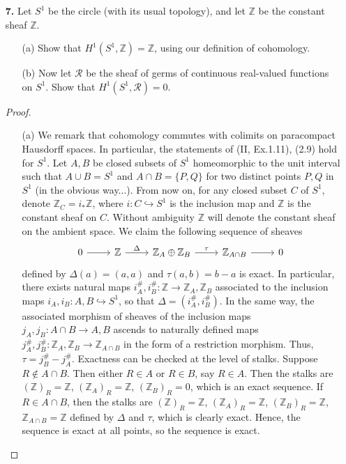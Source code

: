 \documentclass{article}
\newcommand{\fR}{\mathscr{R}}
\newcommand{\Z}{\mathbb{Z}}
\begin{document}
\begin{enumerate} [label=\textbf{\arabic*.}, leftmargin=0em]
\item[\textbf{7.}] Let $S^1$ be the circle (with its usual topology), and let $\Z$ be the constant sheaf $\Z$.
\begin{itemize}
    \item[(a)] Show that $H^1(S^1, \Z) = \Z$, using our definition of cohomology.
    \item[(b)] Now let $\fR$ be the sheaf of germs of continuous real-valued functions on $S^1$. Show that $H^1(S^1, \fR) = 0$.
\end{itemize}

\begin{proof} $ $ \vspace{0pt}
\begin{itemize} [leftmargin=0cm]
\item[(a)] We remark that cohomology commutes with colimits on paracompact Hausdorff spaces. In particular, the statements of (II, Ex.1.11), (2.9) hold for $S^1$. Let $A, B$ be closed subsets of $S^1$ homeomorphic to the unit interval such that $A \cup B = S^1$ and $A \cap B = \{ P, Q \}$ for two distinct points $P, Q$ in $S^1$ (in the obvious way...). From now on, for any closed subset $C$ of $S^1$, denote $\Z_C = i_* \Z$, where $i : C \hookrightarrow S^1$ is the inclusion map and $\Z$ is the constant sheaf on $C$. Without ambiguity $\Z$ will denote the constant sheaf on the ambient space. We claim the following sequence of sheaves
\[\begin{tikzcd}
    0 \arrow[r] & \Z \arrow[r, "\Delta"] & \Z_A \oplus \Z_B \arrow[r, "\tau"] & \Z_{A \cap B} \arrow[r] & 0
    \end{tikzcd}\]
defined by $\Delta(a) = (a, a)$ and $\tau(a, b) = b - a$ is exact. In particular, there exists natural maps $i^\#_A, i^\#_B : \Z \to \Z_A, \Z_B$ associated to the inclusion maps $i_A, i_B : A, B \hookrightarrow S^1$, so that $\Delta = (i_A^\#, i_B^\#)$. In the same way, the associated morphism of sheaves of the inclusion maps $j_A, j_B : A \cap B \to A, B$ ascends to naturally defined maps $j_A^\#, j_B^\# : \Z_A, \Z_B \to \Z_{A \cap B}$ in the form of a restriction morphism. Thus, $\tau = j_B^\# - j_A^\#$. Exactness can be checked at the level of stalks. Suppose $R \notin A \cap B$. Then either $R \in A$ or $R \in B$, say $R \in A$. Then the stalks are $(\Z)_R = \Z$, $(\Z_A)_R = \Z$, $(\Z_B)_R = 0$, which is an exact sequence. If $R \in A \cap B$, then the stalks are $(\Z)_R = \Z$, $(\Z_A)_R = \Z$, $(\Z_B)_R = \Z$, $\Z_{A \cap B} = \Z$ defined by $\Delta$ and $\tau$, which is clearly exact. Hence, the sequence is exact at all points, so the sequence is exact.


\end{itemize}
\end{proof}
\end{enumerate}
\end{document}
